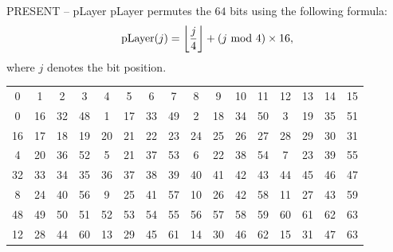 \begin{frame}{PRESENT -- pLayer}
pLayer permutes the $64$ bits using the following formula:
\[
\text{pLayer}(j)=\left\lfloor\frac{j}{4}\right\rfloor+(j\textrm{~mod~} 4)\times16,
\]
where $j$ denotes the bit position.
\begin{table}[htb]
\centering
\begin{tabular}{cccccccccccccccc}\hline
0 & 1 & 2 & 3 & 4 & 5 & 6 & 7 & 8 & 9 & 10 & 11 & 12 & 13 & 14 & 15 \\
0 & 16 & 32 & 48 & 1 & 17 & 33 & 49 & 2 & 18 & 34 & 50 & 3 & 19 & 35 & 51 \\\hline
16 & 17 & 18 & 19 & 20 & 21 & 22 & 23 & 24 & 25 & 26 & 27 & 28 & 29 & 30 & 31 \\
4 & 20 & 36 & 52 & 5 & 21 & 37 & 53 & 6 & 22 & 38 & 54 & 7 & 23 & 39 & 55 \\\hline
32 & 33 & 34 & 35 & 36 & 37 & 38 & 39 & 40 & 41 & 42 & 43 & 44 & 45 & 46 & 47 \\
8 & 24 & 40 & 56 & 9 & 25 & 41 & 57 & 10 & 26 & 42 & 58 & 11 & 27 & 43 & 59 \\\hline
48 & 49 & 50 & 51 & 52 & 53 & 54 & 55 & 56 & 57 & 58 & 59 & 60 & 61 & 62 & 63 \\
12 & 28 & 44 & 60 & 13 & 29 & 45 & 61 & 14 & 30 & 46 & 62 & 15 & 31 & 47 & 63\\\hline
\end{tabular}
\end{table}
\end{frame}


